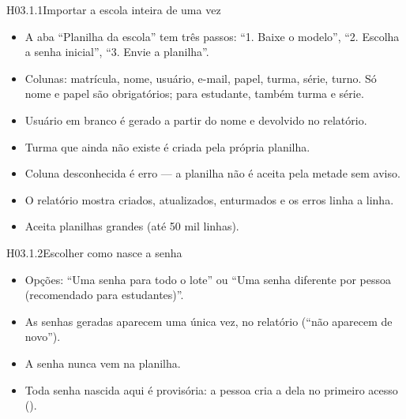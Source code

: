 \begin{historia}{H03.1.1}{Importar a escola inteira de uma vez}{\pronto}
\aceite
\begin{itemize}
  \item A aba \enquote{Planilha da escola} tem três passos: \enquote{1. Baixe o
    modelo}, \enquote{2. Escolha a senha inicial}, \enquote{3. Envie a
    planilha}.
  \item Colunas: matrícula, nome, usuário, e-mail, papel, turma, série, turno.
    Só nome e papel são obrigatórios; para estudante, também turma e série.
  \item Usuário em branco é gerado a partir do nome e devolvido no relatório.
  \item Turma que ainda não existe é criada pela própria planilha.
  \item Coluna desconhecida é erro --- a planilha não é aceita pela metade sem
    aviso.
  \item O relatório mostra criados, atualizados, enturmados e os erros linha a
    linha.
  \item Aceita planilhas grandes (até 50 mil linhas).
\end{itemize}
\end{historia}

\begin{historia}{H03.1.2}{Escolher como nasce a senha}{\pronto}
\aceite
\begin{itemize}
  \item Opções: \enquote{Uma senha para todo o lote} ou \enquote{Uma senha
    diferente por pessoa (recomendado para estudantes)}.
  \item As senhas geradas aparecem uma única vez, no relatório (\enquote{não
    aparecem de novo}).
  \item A senha nunca vem na planilha.
  \item Toda senha nascida aqui é provisória: a pessoa cria a dela no primeiro
    acesso ().
\end{itemize}
\end{historia}

